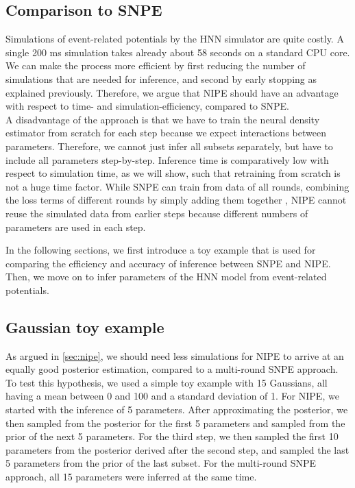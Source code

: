 \documentclass[12pt]{extreport}
\begin{document}
\subsection{Comparison to SNPE}

Simulations of event-related potentials by the HNN simulator are quite costly. A single 200 ms simulation takes already about 58 seconds on a standard CPU core. We can make the process more efficient by first reducing the number of simulations that are needed for inference, and second by early stopping as explained previously. Therefore, we argue that NIPE should have an advantage with respect to time- and simulation-efficiency, compared to SNPE. \\

A disadvantage of the approach is that we have to train the neural density estimator from scratch for each step because we expect interactions between parameters. Therefore, we cannot just infer all subsets separately, but have to include all parameters step-by-step. Inference time is comparatively low with respect to simulation time, as we will show, such that retraining from scratch is not a huge time factor. While SNPE can train from data of all rounds, combining the loss terms of different rounds by simply adding them together \citep{greenberg_automatic_2019}, NIPE cannot reuse the simulated data from earlier steps because different numbers of parameters are used in each step.


In the following sections, we first introduce a toy example that is used for comparing the efficiency and accuracy of inference between SNPE and NIPE. Then, we move on to infer parameters of the HNN model from event-related potentials. 

\subsection{Gaussian toy example}


As argued in \ref{sec:nipe}, we should need less simulations for NIPE to arrive at an equally good posterior estimation, compared to a multi-round SNPE approach. \\

To test this hypothesis, we used a simple toy example with 15 Gaussians, all having a mean between 0 and 100 and a standard deviation of 1. For NIPE, we started with the inference of 5 parameters. After approximating the posterior, we then sampled from the posterior for the first 5 parameters and sampled from the prior of the next 5 parameters. For the third step, we then sampled the first 10 parameters from the posterior derived after the second step, and sampled the last 5 parameters from the prior of the last subset. For the multi-round SNPE approach, all 15 parameters were inferred at the same time. \\
\end{document}

